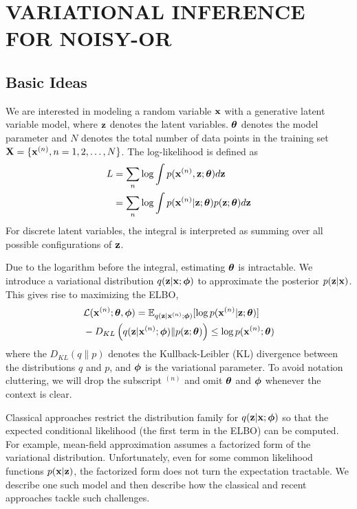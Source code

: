 \section{VARIATIONAL INFERENCE FOR \textsc{NOISY-OR}}
\label{sec: vi}


\subsection{Basic Ideas}




We are interested in modeling a random variable $\mathbf{x}$ with a generative latent variable model, where $\mathbf{z}$ denotes the latent variables. $\bm{\theta}$ denotes the model parameter and $N$ denotes the total number of data points in the training set $\mathbf{X} = \{\mathbf{x}^{(n)}, n=1, 2, \ldots, N\}$. The log-likelihood is defined as 
\begin{align}
L &  = \sum_n \log \int p(\mathbf{x}^{(n)}, \mathbf{z}; \bm{\theta})d\mathbf{z} \nonumber \\
& = \sum_n \log \int p(\mathbf{x}^{(n)}| \mathbf{z}; \bm{\theta}) p(\mathbf{z} ; \bm{\theta})d\mathbf{z}
\end{align}
For discrete latent variables, the integral is interpreted as summing over all possible configurations of $\mathbf{z}$. 

Due to the logarithm before the integral, estimating $\bm{\theta}$ is intractable. We introduce a variational distribution $q(\mathbf{z}|\mathbf{x}; \bm{\phi})$ to approximate the   posterior $p(\mathbf{z}|\mathbf{x})$. This gives rise to maximizing the ELBO,
\begin{align}
   & \mathcal{L}(\mathbf{x}^{(n)}; \bm{\theta}, \bm{\phi})  = \mathbb{E}_{q(\mathbf{z}|\mathbf{x}^{(n)}; {\bm{\phi}})}[\log p(\mathbf{x}^{(n)}|\mathbf{z}; \bm{\theta})] \nonumber\\
   & - D_{KL}\left(q(\mathbf{z}|\mathbf{x}^{(n)}; {\bm{\phi}}) \|p(\mathbf{z}; \bm{\theta} ) \right) \leq \log p(\mathbf{x}^{(n)};{\bm{\theta}})
\label{eq:elbo}
\end{align}
where the $D_{KL}(q\|p)$ denotes the Kullback-Leibler (KL) divergence between the distributions $q$ and $p$, and $\bm{\phi}$ is the variational parameter. To avoid notation cluttering, we will drop the subscript $^{(n)}$ and omit $\bm{\theta}$ and $\bm{\phi}$ whenever the context is clear.


Classical approaches restrict the distribution family for $q(\mathbf{z}|\mathbf{x}; \bm{\phi})$ so that the expected conditional likelihood (the first term in the ELBO) can be computed. For example, mean-field approximation assumes a factorized form of the variational distribution.
Unfortunately, even for some common likelihood functions $p(\mathbf{x}|\mathbf{z})$, the factorized form does not turn the expectation tractable.  We describe one such model and then describe how the classical and recent approaches  tackle such challenges.



